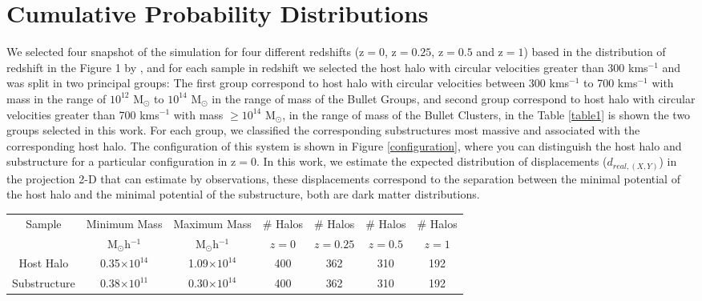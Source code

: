 \documentclass[12pt,preprint]{aastex}
\begin{document}
\section{Cumulative Probability Distributions}
\label{cumulative distribution}

We selected four snapshot of the simulation for four different redshifts (z$=0$, z$=0.25$, z$=0.5$ and z$=1$) based in the 
distribution of redshift in the Figure 1 by \citet{verdugo}, and 
for each sample in redshift we selected the host halo with circular velocities greater than 300 kms$^{-1}$ and was split in two 
principal groups: The first group correspond to host halo with circular velocities between 300 kms$^{-1}$ to 700 kms${^{-1}}$
with mass in the range of $10^{12}$ M$_\odot{}$ to $10^{14}$ M$_\odot{}$ in the range of mass of the
Bullet Groups, and second group correspond to host halo with circular velocities greater than 
700 kms$^{-1}$ with mass $\geq10^{14}$ M$_\odot{}$, in the range of mass of the Bullet Clusters, in 
the Table \ref{table1} is shown the two groups selected in this work. For each group, we 
classified the corresponding substructures most massive and associated with the corresponding 
host halo. The configuration of this system is shown in 
Figure \ref{configuration}, where you can distinguish the host halo and substructure for a particular configuration in z$=0$. In 
this work, we estimate the expected distribution of displacements ($d_{real,(X,Y)}$) in the projection 2-D that can estimate by 
observations, these displacements correspond to the separation between the minimal potential of the host halo and the 
minimal potential of the substructure, both are dark matter distributions.\\

\begin{table*}
\begin{center}
\begin{tabular}{ccccccc}\hline\hline
Sample       & Minimum Mass           & Maximum Mass          & \# Halos  & \# Halos  & \# Halos & \# Halos \\
             & M$_{\odot}$h$^{-1}$    & M$_{\odot}$h$^{-1}$   &   $z=0$   & $z=0.25$  & $z=0.5$  & $z=1$  \\\hline
Host Halo    & 0.35$\times{}10^{14}$  & 1.09$\times{}10^{14}$ &    400    &   362     &   310    &  192   \\
Substructure & 0.38$\times{}10^{11}$  & 0.30$\times{}10^{14}$ &    400    &   362     &   310    &  192   \\\hline
\end{tabular} 
\caption{Mass ranges for the two groups selected in this work in different redshifts.}
\label{table1}
\end{center}
\end{table*}
\end{document}
